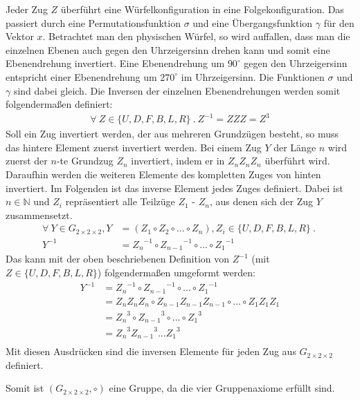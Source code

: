 \documentclass[12pt,a4paper, usenames, dvipsnames]{article}
\theoremstyle{mystyle}
\theoremstyle{definition}
\newcommand{\Gtwo}{\ensuremath{G_{2\times 2\times 2}}}
\begin{document}
\begin{description}
Jeder Zug $Z$ überführt eine Würfelkonfiguration in eine Folgekonfiguration. 
Das passiert durch eine Permutationsfunktion $\sigma$ und eine Übergangsfunktion $\gamma$ für den Vektor $x$. 
Betrachtet man den physischen Würfel, so wird auffallen, dass man die einzelnen Ebenen auch gegen den Uhrzeigersinn drehen kann und somit eine Ebenendrehung invertiert. Eine Ebenendrehung um $90^\circ$ gegen den Uhrzeigersinn entspricht einer Ebenendrehung um $270^\circ$ im Uhrzeigersinn. Die Funktionen $\sigma$ und $\gamma$ sind dabei gleich.
Die Inversen der einzelnen Ebenendrehungen werden somit folgendermaßen definiert:
\begin{align*}
\forall \ Z \in \{U, D, F, B, L, R\} \ . \ Z^{-1} = ZZZ = Z^3
\end{align*}
Soll ein Zug invertiert werden, der aus mehreren Grundzügen besteht, so muss das hintere Element zuerst invertiert werden. Bei einem Zug $Y$ der Länge $n$ wird zuerst der $n$-te Grundzug $Z_n$ invertiert, indem er in $Z_nZ_nZ_n$ überführt wird. Daraufhin werden die weiteren Elemente des kompletten Zuges von hinten invertiert. Im Folgenden ist das inverse Element jedes Zuges definiert. Dabei ist $n \in \mathbb{N}$ und $Z_i$ repräsentiert alle Teilzüge $Z_1$ - $Z_n$, aus denen sich der Zug $Y$ zusammensetzt.
\begin{align*}
\forall \ Y \in \Gtwo, Y & = (Z_1 \circ Z_2 \circ ... \circ Z_n), Z_{i} \in \{U, D, F, B, L, R\} \ . \  \\
Y^{-1} & = {Z_n}^{-1} \circ {Z_{n-1}}^{-1} \circ ... \circ {Z_1}^{-1} 
\end{align*}
Das kann mit der oben beschriebenen Definition von $Z^{-1}$ (mit $Z \in \{U, D, F, B, L, R\} $) folgendermaßen umgeformt werden:
\begin{align*}
Y^{-1} & = {Z_n}^{-1} \circ {Z_{n-1}}^{-1} \circ ... \circ {Z_1}^{-1} \\
& = Z_nZ_nZ_n \circ Z_{n-1}Z_{n-1}Z_{n-1} \circ ... \circ Z_1Z_1Z_1 \\
& = {Z_n}^3 \circ {Z_{n-1}}^3 \circ ... \circ {Z_1}^3 \\
& = {Z_n}^3{Z_{n-1}}^3 ...  {Z_1}^3 \\
\end{align*}
Mit diesen Ausdrücken sind die inversen Elemente für jeden Zug aus $\Gtwo$ definiert.



\end{description}
Somit ist $(\Gtwo, \circ)$ eine Gruppe, da die vier Gruppenaxiome erfüllt sind. 
\end{document}
